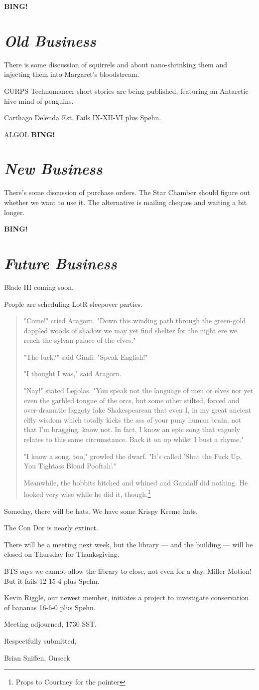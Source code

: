 \documentclass[10pt]{article}
\newcommand{\bing}{{\bf BING!} }
\newcommand{\goto}[1]{\bing \vskip 12pt \section*{{\em{#1}}}}
\newcommand{\ps}{ plus Spehn\xspace}
\begin{document}
\goto{Old Business}
There is some discussion of squirrels and about nano-shrinking them
and injecting them into Margaret's bloodstream.

GURPS Technomancer short stories are being published, featuring an
Antarctic hive mind of penguins.

Carthago Delenda Est.  Fails IX-XII-VI\ps.

ALGOL
\goto{New Business}
There's some discussion of purchase orders.  The Star Chamber should
figure out whether we want to use it.  The alternative is mailing
cheques and waiting a bit longer.


\goto{Future Business}
Blade III coming soon.

People are scheduling LotR sleepover parties.

\begin{quotation}
  "Come!" cried Aragorn. "Down this winding path through the
  green-gold dappled woods of shadow we may yet find shelter for the
  night ere we reach the sylvan palace of the elves."

  "The fuck?" said Gimli. "Speak English!"

  "I thought I was," said Aragorn.

  "Nay!" stated Legolas. "You speak not the language of men or elves
  nor yet even the garbled tongue of the orcs, but some other stilted,
  forced and over-dramatic faggoty fake Shakespearean that even I, in
  my great ancient elfly wisdom which totally kicks the ass of your
  puny human brain, not that I'm bragging, know not. In fact, I know
  an epic song that vaguely relates to this same circumstance. Back it
  on up whilst I bust a rhyme."

  "I know a song, too," growled the dwarf. "It's called 'Shut the Fuck
  Up, You Tightass Blond Pooftah'."

  Meanwhile, the hobbits bitched and whined and Gandalf did nothing.
  He looked very wise while he did it, though.\footnote{Props to
  Courtney for the pointer}
\end{quotation}

Someday, there will be hats.  We have some Krispy Kreme hats.

The Con Dor is nearly extinct.

There will be a meeting next week, but the library --- and the
building --- will be closed on Thursday for Thanksgiving.

BTS says we cannot allow the library to close, not even for a day.  Miller
Motion!  But it fails 12-15-4\ps.

Kevin Riggle, our newest member, initiates a project to investigate
conservation of bananas 16-6-0\ps.

\vspace{12pt}

\noindent
Meeting adjourned, 1730 SST.

\vspace{18pt}

\centerline{Respectfully submitted,}
\centerline{Brian Sniffen, Onseck}
\end{document}
